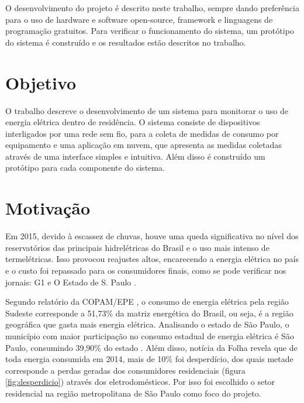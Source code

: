 O desenvolvimento do projeto é descrito neste trabalho, sempre dando preferência para o uso de hardware e software open-source, framework e linguagens de programação gratuitos. Para verificar o funcionamento do sistema, um protótipo do sistema é construído e os resultados estão descritos no trabalho.

\section{Objetivo}
\label{Sec:objetivo}

O trabalho descreve o desenvolvimento de um sistema para monitorar o uso de energia elétrica dentro de residência. O sistema consiste de dispositivos interligados por uma rede sem fio, para a coleta de medidas de consumo por equipamento e uma aplicação em nuvem, que apresenta as medidas coletadas através de uma interface simples e intuitiva. Além disso é construído um protótipo para cada componente do sistema.

\section{Motivação}
\label{Sec:motivacao}

Em 2015, devido à escassez de chuvas, houve uma queda significativa no nível dos reservatórios das principais hidrelétricas do Brasil e o uso mais intenso de termelétricas. Isso provocou reajustes altos, encarecendo a energia elétrica no país e o custo foi repassado para os consumidores finais, como se pode verificar nos jornais: G1 \cite{news_g1} e O Estado de S. Paulo \cite{news_secretaria_de_energia}.

Segundo relatório da COPAM/EPE \cite{copam_epe}, o consumo de energia elétrica pela região Sudeste corresponde a 51,73\% da matriz energética do Brasil, ou seja, é a região geográfica que gasta mais energia elétrica. Analisando o estado de São Paulo, o município com maior participação no consumo estadual de energia elétrica é São Paulo, consumindo 39,90\% do estado \cite{itu}. Além disso, notícia da Folha \cite{folha} revela que de toda energia consumida em 2014, mais de 10\% foi desperdício, dos quais metade corresponde a perdas geradas dos consumidores residenciais (figura \ref{fig:desperdicio}) através dos eletrodomésticos. Por isso foi escolhido o setor residencial na região metropolitana de São Paulo como foco do projeto.

